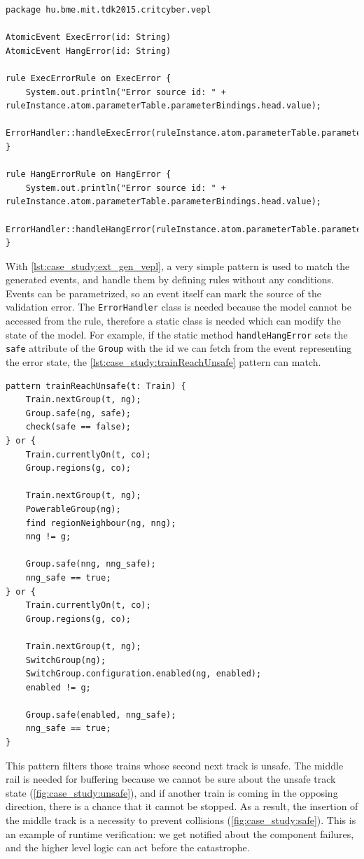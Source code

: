 \begin{lstlisting}[caption={Extended VEPL definition},label=lst:case_study:ext_gen_vepl]
package hu.bme.mit.tdk2015.critcyber.vepl

AtomicEvent ExecError(id: String)
AtomicEvent HangError(id: String)

rule ExecErrorRule on ExecError {
	System.out.println("Error source id: " + ruleInstance.atom.parameterTable.parameterBindings.head.value);
	ErrorHandler::handleExecError(ruleInstance.atom.parameterTable.parameterBindings.head.value)
}

rule HangErrorRule on HangError {
	System.out.println("Error source id: " + ruleInstance.atom.parameterTable.parameterBindings.head.value);
	ErrorHandler::handleHangError(ruleInstance.atom.parameterTable.parameterBindings.head.value)
}
\end{lstlisting}

With \cref{lst:case_study:ext_gen_vepl}, a very simple pattern is used to match the generated events, and handle them by defining rules without any conditions. Events can be parametrized, so an event itself can mark the source of the validation error. The \verb+ErrorHandler+ class is needed because the model cannot be accessed from the rule, therefore a static class is needed which can modify the state of the model. For example, if the static method \verb+handleHangError+ sets the \verb+safe+ attribute of the \verb+Group+ with the id we can fetch from the event representing the error state, the \cref{lst:case_study:trainReachUnsafe} pattern can match.

\newpage
\begin{lstlisting}[caption={Collision detection},label=lst:case_study:trainReachUnsafe]
pattern trainReachUnsafe(t: Train) {
	Train.nextGroup(t, ng);
	Group.safe(ng, safe);
	check(safe == false);
} or {
	Train.currentlyOn(t, co);
	Group.regions(g, co);
	
	Train.nextGroup(t, ng);
	PowerableGroup(ng);
	find regionNeighbour(ng, nng);
	nng != g;
	
	Group.safe(nng, nng_safe);
	nng_safe == true;
} or {
	Train.currentlyOn(t, co);
	Group.regions(g, co);
	
	Train.nextGroup(t, ng);
	SwitchGroup(ng);
	SwitchGroup.configuration.enabled(ng, enabled);
	enabled != g;
	
	Group.safe(enabled, nng_safe);
	nng_safe == true;
}
\end{lstlisting}

This pattern filters those trains whose second next track is unsafe. The middle rail is needed for buffering because we cannot be sure about the unsafe track state (\cref{fig:case_study:unsafe}), and if another train is coming in the opposing direction, there is a chance that it cannot be stopped. As a result, the insertion of the middle track is a necessity to prevent collisions (\cref{fig:case_study:safe}). This is an example of runtime verification: we get notified about the component failures, and the higher level logic can act before the catastrophe.

